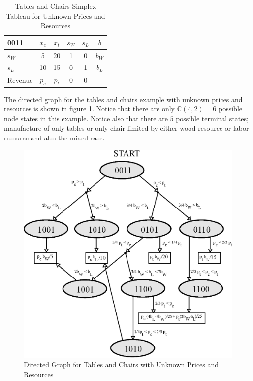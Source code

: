 \begin{table}
\centering
\begin{tabular}{| l | c c c c | c |}
\hline
0011    & $x_c$ & $x_t$ & $s_W$ & $s_L$ & $b$\\
\hline
$s_W$   & 5     & 20    & 1     & 0     & $b_W$\\
$s_L$   & 10    & 15    & 0     & 1     & $b_L$\\
\hline
Revenue & $p_c$    & $p_t$    & 0     & 0     &\\
\hline
\end{tabular}
  \caption[Tables and Chairs Simplex Tableau for Unknown Prices and Resources]
          {Tables and Chairs Simplex Tableau for Unknown Prices and Resources}
  \label{tab:pr0011}
\end{table}

The directed graph for the tables and chairs example
with unknown prices and resources is shown in figure
\ref{fig:tcpr_directed_graph}. Notice that there are only
$\mathbb{C}(4,2) = 6$ possible node states in this example. Notice
also that there are $5$ possible terminal states; manufacture of only
tables or only chair limited by either wood resource or labor resource
and also the mixed case.  

\begin{figure}
  \centering
  \includegraphics{Images/tcpr_directed_graph}
  \caption[Directed Graph for Tables and Chairs with Unknown Prices and Resources]
          {Directed Graph for Tables and Chairs with Unknown Prices and Resources}
  \label{fig:tcpr_directed_graph}
\end{figure}

